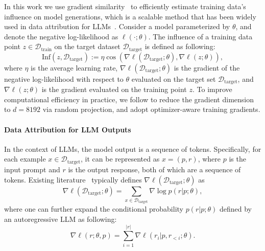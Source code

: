 \documentclass[11pt]{article}
\begin{document}
In this work we use gradient similarity~\citep{pruthi2020estimatingtrainingdatainfluence} to efficiently estimate training data's influence on model generations, which is a scalable method that has been widely used in data attribution for LLMs~\citep{xia2024lessselectinginfluentialdata}. Consider a model parameterized by $\theta$, and denote the negative log-likelihood as $\ell(\cdot;\theta)$. The influence of a training data point $z\in \mathcal{D}_{\text{train}}$ on the target dataset $\mathcal{D}_{\text{target}}$ is defined as following:
$$
\mathrm{Inf}(z, \mathcal{D}_{\text{target}}) := \eta \cos(\nabla \ell(\mathcal{D}_{\text{target}}; \theta), \nabla \ell(z; \theta)),
$$
where $\eta$ is the average learning rate, $\nabla \ell(\mathcal{D}_{\text{target}}; \theta)$ is the gradient of the negative log-likelihood with respect to $\theta$ evaluated on the target set $\mathcal{D}_{\text{target}}$, and $\nabla \ell(z; \theta)$ is the gradient evaluated on the training point $z$. To improve computational efficiency in practice, we follow \citet{xia2024lessselectinginfluentialdata} to reduce the gradient dimension to $d=8192$ via random projection, and adopt optimizer-aware training gradients.

\paragraph{Data Attribution for LLM Outputs} In the context of LLMs, the model output is a sequence of tokens. Specifically, for each example $x \in \mathcal{D}_{\text{target}}$, it can be represented as $x = (p, r)$, where $p$ is the input prompt and $r$ is the output response, both of which are a sequence of tokens. Existing literature~\citep{xia2024lessselectinginfluentialdata} typically defines $\nabla \ell(\mathcal{D}_{\text{target}}; \theta)$ as 
$$
\nabla \ell(\mathcal{D}_{\text{target}}; \theta) = \sum_{x \in \mathcal{D}_{\text{target}}} \nabla \log p(r|p; \theta),
$$
where one can further expand the conditional probability $p(r|p; \theta)$ defined by an autoregressive LLM as following:
$$
\nabla \ell(r;\theta,p) = \sum_{i = 1}^{|r|} \nabla \ell(r_i|p,r_{< i};\theta).
$$
\end{document}
